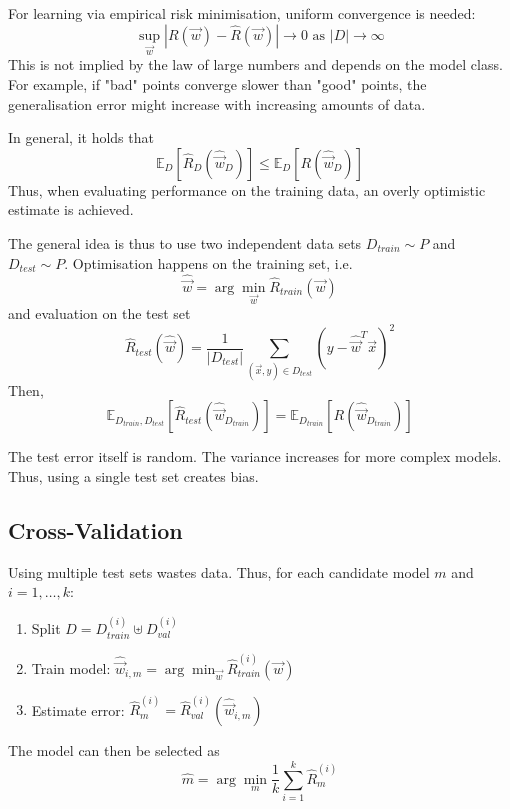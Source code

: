 For learning via empirical risk minimisation,
uniform convergence is needed:
\begin{equation*}
    \sup_{\vec{w}}{|R(\vec{w}) - \hat{R}(\vec{w})|} \to 0
    \text{ as $|D| \to \infty$}
\end{equation*}
This is not implied by the law of large numbers
and depends on the model class.
For example, if "bad" points converge slower than
"good" points, the generalisation error might increase
with increasing amounts of data.

In general, it holds that
\begin{equation*}
    \mathbb{E}_D[\hat{R}_D(\hat{\vec{w}}_D)] \leq
    \mathbb{E}_D[R(\hat{\vec{w}}_D)]
\end{equation*}
Thus, when evaluating performance on the training data,
an overly optimistic estimate is achieved.

The general idea is thus to use two independent data sets
$D_{train} \sim P$ and $D_{test} \sim P$.
Optimisation happens on the training set, i.e.
\begin{equation*}
    \hat{\vec{w}} = \arg\min_{\vec{w}}{\hat{R}_{train}(\vec{w})}
\end{equation*}
and evaluation on the test set
\begin{equation*}
    \hat{R}_{test}(\hat{\vec{w}}) = \frac{1}{|D_{test}|}
    \sum_{(\vec{x}, y) \in D_{test}}{
        (y - \hat{\vec{w}}^T \vec{x})^2
    }
\end{equation*}
Then,
\begin{equation*}
    \mathbb{E}_{D_{train}, D_{test}}[\hat{R}_{test}(\hat{\vec{w}}_{D_{train}})] =
    \mathbb{E}_{D_{train}}[R(\hat{\vec{w}}_{D_{train}})]
\end{equation*}

The test error itself is random.
The variance increases for more complex models.
Thus, using a single test set creates bias.


\subsection{Cross-Validation}
Using multiple test sets wastes data.
Thus, for each candidate model $m$
and $i = 1, \dotsc, k$:
\begin{enumerate}
    \item Split $D = D_{train}^{(i)} \uplus D_{val}^{(i)}$
    \item Train model:
    $\hat{\vec{w}}_{i,m} = \arg\min_{\vec{w}}{\hat{R}_{train}^{(i)}(\vec{w})}$
    \item Estimate error:
    $\hat{R}_{m}^{(i)} = \hat{R}_{val}^{(i)}(\hat{\vec{w}}_{i, m})$
\end{enumerate}
The model can then be selected as
\begin{equation*}
    \hat{m} = \arg\min_m{\frac{1}{k}
        \sum_{i=1}^k{\hat{R}_m^{(i)}}
    }
\end{equation*}

